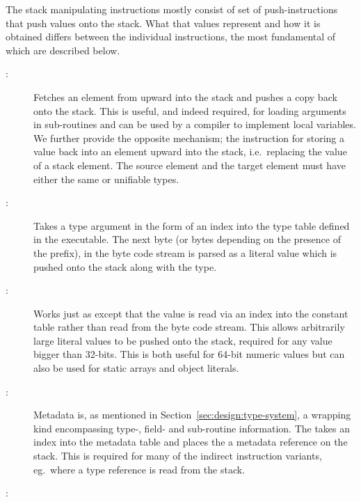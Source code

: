 The stack manipulating instructions mostly consist of set of push-instructions
that push values onto the stack. What that values represent and how it is
obtained differs between the individual instructions, the most fundamental of
which are described below.

\begin{description}

\item[:]

  Fetches an element from upward into the stack and pushes a copy back onto the
  stack. This is useful, and indeed required, for loading arguments in
  sub-routines and can be used by a compiler to implement local variables. We
  further provide the opposite mechanism; the  instruction
  for storing a value back into an element upward into the stack, i.e.~replacing
  the value of a stack element. The source element and the target element must
  have either the same or unifiable types.

\item[:]

  Takes a type argument in the form of an index into the type table defined in
  the executable. The next byte (or bytes depending on the presence of the
   prefix), in the byte code stream is parsed as a literal value
  which is pushed onto the stack along with the type.

\item[:]

  Works just as  except that the value is read via an index
  into the constant table rather than read from the byte code stream. This
  allows arbitrarily large literal values to be pushed onto the stack, required
  for any value bigger than 32-bits. This is both useful for 64-bit numeric
  values but can also be used for static arrays and object literals.

\item[:]

  Metadata is, as mentioned in Section~\ref{sec:design:type-system}, a wrapping
  kind encompassing type-, field- and sub-routine information. The
   takes an index into the metadata table and places the a
  metadata reference on the stack. This is required for many of the indirect
  instruction variants, eg.~where a type reference is read from the stack.

\item[:]


\end{description}
